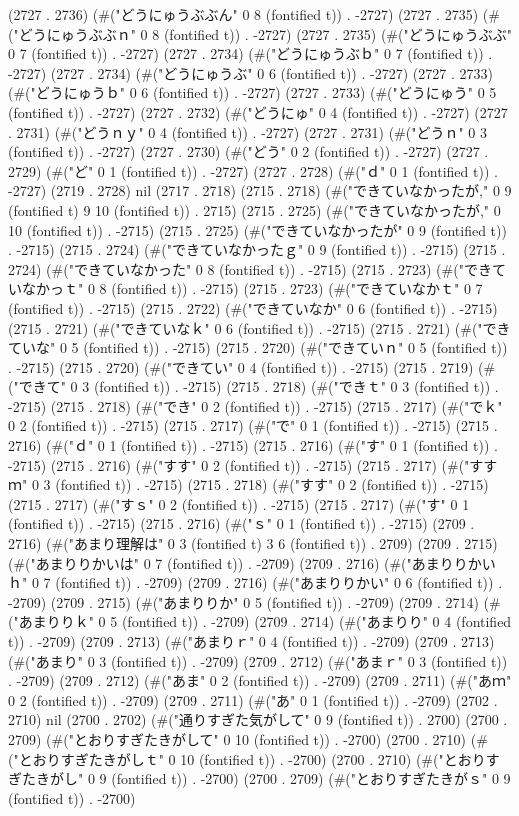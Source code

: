 (2727 . 2736) (#("どうにゅうぶぶん" 0 8 (fontified t)) . -2727) (2727 . 2735) (#("どうにゅうぶぶｎ" 0 8 (fontified t)) . -2727) (2727 . 2735) (#("どうにゅうぶぶ" 0 7 (fontified t)) . -2727) (2727 . 2734) (#("どうにゅうぶｂ" 0 7 (fontified t)) . -2727) (2727 . 2734) (#("どうにゅうぶ" 0 6 (fontified t)) . -2727) (2727 . 2733) (#("どうにゅうｂ" 0 6 (fontified t)) . -2727) (2727 . 2733) (#("どうにゅう" 0 5 (fontified t)) . -2727) (2727 . 2732) (#("どうにゅ" 0 4 (fontified t)) . -2727) (2727 . 2731) (#("どうｎｙ" 0 4 (fontified t)) . -2727) (2727 . 2731) (#("どうｎ" 0 3 (fontified t)) . -2727) (2727 . 2730) (#("どう" 0 2 (fontified t)) . -2727) (2727 . 2729) (#("ど" 0 1 (fontified t)) . -2727) (2727 . 2728) (#("ｄ" 0 1 (fontified t)) . -2727) (2719 . 2728) nil (2717 . 2718) (2715 . 2718) (#("できていなかったが," 0 9 (fontified t) 9 10 (fontified t)) . 2715) (2715 . 2725) (#("できていなかったが," 0 10 (fontified t)) . -2715) (2715 . 2725) (#("できていなかったが" 0 9 (fontified t)) . -2715) (2715 . 2724) (#("できていなかったｇ" 0 9 (fontified t)) . -2715) (2715 . 2724) (#("できていなかった" 0 8 (fontified t)) . -2715) (2715 . 2723) (#("できていなかっｔ" 0 8 (fontified t)) . -2715) (2715 . 2723) (#("できていなかｔ" 0 7 (fontified t)) . -2715) (2715 . 2722) (#("できていなか" 0 6 (fontified t)) . -2715) (2715 . 2721) (#("できていなｋ" 0 6 (fontified t)) . -2715) (2715 . 2721) (#("できていな" 0 5 (fontified t)) . -2715) (2715 . 2720) (#("できていｎ" 0 5 (fontified t)) . -2715) (2715 . 2720) (#("できてい" 0 4 (fontified t)) . -2715) (2715 . 2719) (#("できて" 0 3 (fontified t)) . -2715) (2715 . 2718) (#("できｔ" 0 3 (fontified t)) . -2715) (2715 . 2718) (#("でき" 0 2 (fontified t)) . -2715) (2715 . 2717) (#("でｋ" 0 2 (fontified t)) . -2715) (2715 . 2717) (#("で" 0 1 (fontified t)) . -2715) (2715 . 2716) (#("ｄ" 0 1 (fontified t)) . -2715) (2715 . 2716) (#("す" 0 1 (fontified t)) . -2715) (2715 . 2716) (#("すす" 0 2 (fontified t)) . -2715) (2715 . 2717) (#("すすｍ" 0 3 (fontified t)) . -2715) (2715 . 2718) (#("すす" 0 2 (fontified t)) . -2715) (2715 . 2717) (#("すｓ" 0 2 (fontified t)) . -2715) (2715 . 2717) (#("す" 0 1 (fontified t)) . -2715) (2715 . 2716) (#("ｓ" 0 1 (fontified t)) . -2715) (2709 . 2716) (#("あまり理解は" 0 3 (fontified t) 3 6 (fontified t)) . 2709) (2709 . 2715) (#("あまりりかいは" 0 7 (fontified t)) . -2709) (2709 . 2716) (#("あまりりかいｈ" 0 7 (fontified t)) . -2709) (2709 . 2716) (#("あまりりかい" 0 6 (fontified t)) . -2709) (2709 . 2715) (#("あまりりか" 0 5 (fontified t)) . -2709) (2709 . 2714) (#("あまりりｋ" 0 5 (fontified t)) . -2709) (2709 . 2714) (#("あまりり" 0 4 (fontified t)) . -2709) (2709 . 2713) (#("あまりｒ" 0 4 (fontified t)) . -2709) (2709 . 2713) (#("あまり" 0 3 (fontified t)) . -2709) (2709 . 2712) (#("あまｒ" 0 3 (fontified t)) . -2709) (2709 . 2712) (#("あま" 0 2 (fontified t)) . -2709) (2709 . 2711) (#("あｍ" 0 2 (fontified t)) . -2709) (2709 . 2711) (#("あ" 0 1 (fontified t)) . -2709) (2702 . 2710) nil (2700 . 2702) (#("通りすぎた気がして" 0 9 (fontified t)) . 2700) (2700 . 2709) (#("とおりすぎたきがして" 0 10 (fontified t)) . -2700) (2700 . 2710) (#("とおりすぎたきがしｔ" 0 10 (fontified t)) . -2700) (2700 . 2710) (#("とおりすぎたきがし" 0 9 (fontified t)) . -2700) (2700 . 2709) (#("とおりすぎたきがｓ" 0 9 (fontified t)) . -2700) 